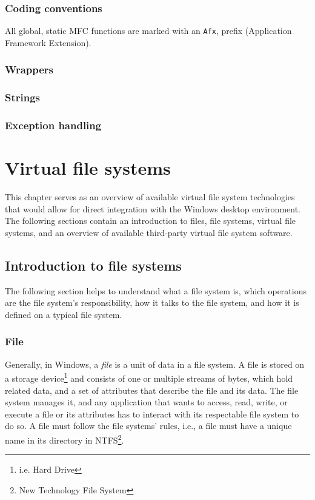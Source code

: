 \subsubsection{Coding conventions}
All global, static MFC functions are marked with an \lstinline{Afx}, prefix (Application Framework Extension). 

\subsubsection{Wrappers}

\subsubsection{Strings}

\subsubsection{Exception handling}


\section{Virtual file systems}
This chapter serves as an overview of available virtual file system technologies that would allow for direct integration with the Windows desktop environment. The following sections contain an introduction to files, file systems, virtual file systems, and an overview of available third-party virtual file system software.

\subsection{Introduction to file systems}
The following section helps to understand what a file system is, which operations are the file system's responsibility, how it talks to the file system, and how it is defined on a typical file system.

\subsubsection{File}
\label{file}
Generally, in Windows, a \textit{file} is a unit of data in a file system. A file is stored on a storage device\footnote{i.e. Hard Drive} and consists of one or multiple streams of bytes, which hold related data, and a set of attributes that describe the file and its data. The file system manages it, and any application that wants to access, read, write, or execute a file or its attributes has to interact with its respectable file system to do so. A file must follow the file systems' rules, i.e., a file must have a unique name in its directory in NTFS\footnote{New Technology File System}.\cite{FilesAndClusters}

